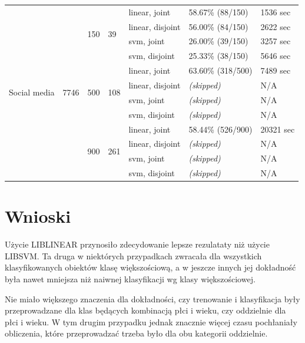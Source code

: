 \documentclass{article}
\begin{document}
\begin{adjustwidth}{-4cm}{-0cm}
\begin{tabular}{|p{2cm}|p{2cm}|p{2cm}|p{2cm}|p{3cm}|p{3cm}|p{3cm}|}
\multirow{12}{*}{Social media} & \multirow{12}{*}{7746} & \multirow{4}{*}{150} & \multirow{4}{*}{39} & 
linear, joint & 58.67\% (88/150) & 1536  sec \\  \cline{5-7}
& & & & 
linear, disjoint & 56.00\% (84/150) & 2622 sec \\  \cline{5-7}
& & & & 
svm, joint & 26.00\% (39/150) & 3257 sec \\  \cline{5-7}
& & & & 
svm, disjoint & 25.33\% (38/150) & 5646 sec \\  \cline{3-7}

& & \multirow{4}{*}{500} & \multirow{4}{*}{108} & 
linear, joint & 63.60\% (318/500) & 7489 sec \\  \cline{5-7}
& & & & 
linear, disjoint & \textit{(skipped)} & N/A \\  \cline{5-7}
& & & & 
svm, joint & \textit{(skipped)} & N/A \\  \cline{5-7}
& & & & 
svm, disjoint & \textit{(skipped)} & N/A \\  \cline{3-7}

& & \multirow{4}{*}{900} & \multirow{4}{*}{261} & 
linear, joint & 58.44\% (526/900) & 20321 sec \\  \cline{5-7}
& & & & 
linear, disjoint & \textit{(skipped)} & N/A \\  \cline{5-7}
& & & & 
svm, joint & \textit{(skipped)} & N/A \\  \cline{5-7}
& & & & 
svm, disjoint & \textit{(skipped)} & N/A \\  \hline


\end{tabular}

\end{adjustwidth}



\section{Wnioski}

Użycie LIBLINEAR przynosiło zdecydowanie lepsze rezulataty niż użycie LIBSVM. Ta druga w niektórych przypadkach zwracała dla wszystkich klasyfikowanych obiektów klasę większościową, a w jeszcze innych jej dokładność była nawet mniejsza niż naiwnej klasyfikacji wg klasy większościowej.

Nie miało większego znaczenia dla dokładności, czy trenowanie i klasyfikacja były przeprowadzane dla klas będących kombinacją płci i wieku, czy oddzielnie dla płci i wieku. W tym drugim przypadku jednak znacznie więcej czasu pochłaniały obliczenia, które przeprowadzać trzeba było dla obu kategorii oddzielnie.
\end{document}

